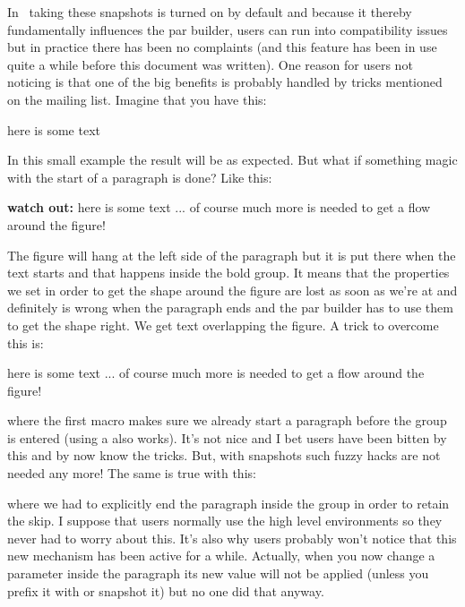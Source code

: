 In \LMTX\ taking these snapshots is turned on by default and because it thereby
fundamentally influences the par builder, users can run into compatibility issues
but in practice there has been no complaints (and this feature has been in use
quite a while before this document was written). One reason for users not
noticing is that one of the big benefits is probably handled by tricks mentioned
on the mailing list. Imagine that you have this:

 here is some text
\stoptyping

In this small example the result will be as expected. But what if something magic
with the start of a paragraph is done? Like this:

\starttyping[option=TEX]

{\bf watch out:} here is some text ... of course much more is needed to
    get a flow around the figure!
\stoptyping

The figure will hang at the left side of the paragraph but it is put there when
the text starts and that happens inside the bold group. It means that the
properties we set in order to get the shape around the figure are lost as soon as
we're at  and definitely is wrong when the
paragraph ends and the par builder has to use them to get the shape right. We get
text overlapping the figure. A trick to overcome this is:

\starttyping[option=TEX]
 here is some text ... of course much
    more is needed to get a flow around the figure!
\stoptyping

where the first macro makes sure we already start a paragraph before the group is
entered (using a \type {\strut} also works). It's not nice and I bet users have
been bitten by this and by now know the tricks. But, with snapshots such fuzzy
hacks are not needed any more! The same is true with this:

\stoptyping

where we had to explicitly end the paragraph inside the group in order to retain
the skip. I suppose that users normally use the high level environments so they
never had to worry about this. It's also why users probably won't notice that
this new mechanism has been active for a while. Actually, when you now change a
parameter inside the paragraph its new value will not be applied (unless you
prefix it with \type {\frozen} or snapshot it) but no one did that anyway.

